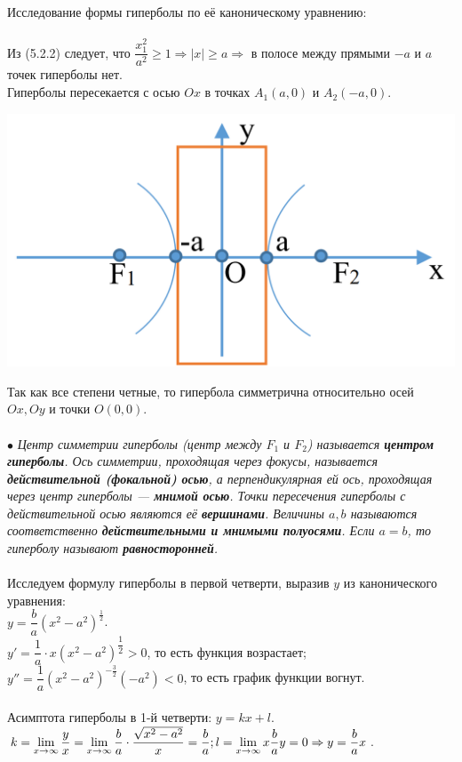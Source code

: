 Исследование формы гиперболы по её каноническому уравнению:\\\\
Из (5.2.2) следует, что $\dfrac{x_1^2}{a^2} \geqslant 1 \Rightarrow |x| \geqslant a \Rightarrow$ в полосе между прямыми $-a$ и $a$ точек гиперболы нет.\\
Гиперболы пересекается с осью $Ox$ в точках $A_1(a, 0)$ и $A_2(-a, 0)$.
\begin{center}
	\includegraphics[scale=0.4]{images/gip2.png}
\end{center}
Так как все степени четные, то гипербола симметрична относительно осей $Ox, Oy$ и точки $O(0, 0)$. \\\\
$\bullet$ \textit{Центр симметрии
	гиперболы (центр между $F_1$ и $F_2$) называется \textbf{центром гиперболы}. Ось симметрии, проходящая
	через фокусы, называется \textbf{действительной (фокальной) осью}, а перпендикулярная ей ось,
	проходящая через центр гиперболы --- \textbf{мнимой осью}. Точки пересечения гиперболы с действительной
	осью являются её \textbf{вершинами}. Величины $a, b$ называются соответственно \textbf{действительными и
		мнимыми полуосями}. Если $a = b$, то гиперболу называют \textbf{равносторонней}.}\\\\
Исследуем формулу гиперболы в первой четверти, выразив $y$ из канонического уравнения:\\
$y= \dfrac{b}{a}(x^2 - a^2)^{\frac{1}{2}}$. \\$y' = \dfrac{1}{a}\cdot x(x^2 - a^2)^{\dfrac{1}{2}} > 0$, то есть функция возрастает;\\
$y'' = \dfrac{1}{a}(x^2 - a^2)^{-\frac{3}{2}}(-a^2) < 0$, то есть график функции вогнут.\\\\
Асимптота гиперболы в 1-й четверти: $y = kx + l$.\\ $k = \lim\limits_{x \to \infty}\dfrac{y}{x} = \lim\limits_{x \to \infty} \dfrac{b}{a}\cdot \dfrac{\sqrt{x^2 - a^2}}{x} = \dfrac{b}{a};\\ l = \lim\limits_{x \to \infty}x\dfrac{b}{a}y = 0 \Rightarrow y = \dfrac{b}{a}x$.

